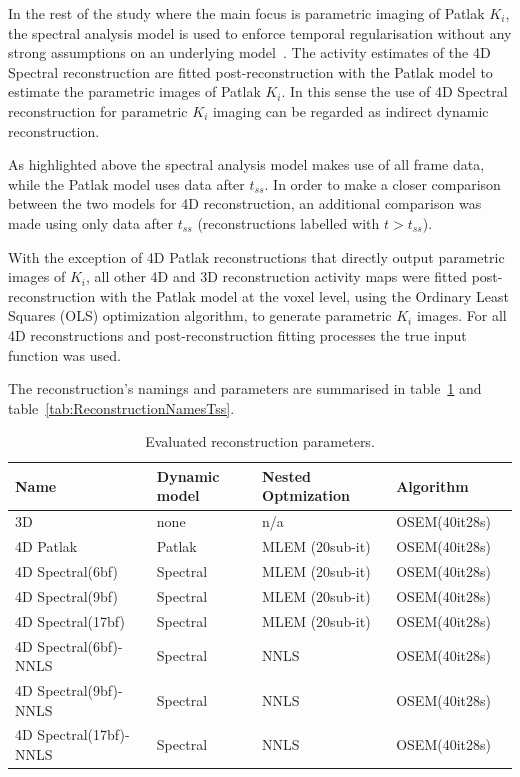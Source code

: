 \begin{itemize}
In the rest of the study where the main focus is parametric imaging of Patlak ${K_i}$, the spectral analysis model is used to enforce temporal regularisation without any strong assumptions on an underlying model~\cite{Reader2007}.
The  activity estimates of the 4D Spectral reconstruction are fitted post-reconstruction with the Patlak model
to estimate the parametric images of Patlak ${K_i}$. 
In this sense the use of 4D Spectral reconstruction for parametric $K_i$ imaging can be regarded as indirect dynamic reconstruction.
\end{itemize}

As highlighted above the spectral analysis model makes use of all frame data, while the Patlak model uses data after $t_{ss}$. In order to make a closer comparison between the two models for 4D reconstruction, an additional comparison was made using only data after $t_{ss}$ (reconstructions labelled with $t > t_{ss}$).

With the exception of 4D Patlak reconstructions that directly output parametric images of $K_i$, all other 4D and 3D reconstruction activity maps were fitted post-reconstruction with the Patlak model at the voxel level, using the Ordinary Least Squares (OLS) optimization algorithm, to generate parametric $K_i$ images. For all 4D reconstructions and post-reconstruction fitting processes the true input function was used.

The reconstruction's namings and parameters are summarised in table~\ref{tab:ReconstructionNames} and table~\ref{tab:ReconstructionNamesTss}.

\begin{table}[h!]
\caption{\label{tab:ReconstructionNames}Evaluated reconstruction parameters.}
\begin{tabular}{lllll}
\toprule
\textbf{Name} & \textbf{Dynamic model} & \textbf{Nested Optmization} & \textbf{Algorithm}  \\
\midrule
3D                   & none     & n/a              & OSEM(40it28s) \\
4D Patlak            & Patlak   & MLEM (20sub-it)  & OSEM(40it28s) \\
4D Spectral(6bf)     & Spectral & MLEM (20sub-it)  & OSEM(40it28s) \\
4D Spectral(9bf)     & Spectral & MLEM (20sub-it)  & OSEM(40it28s) \\
4D Spectral(17bf)    & Spectral & MLEM (20sub-it)  & OSEM(40it28s) \\
4D Spectral(6bf)-NNLS & Spectral & NNLS            & OSEM(40it28s) \\
4D Spectral(9bf)-NNLS & Spectral & NNLS            & OSEM(40it28s) \\
4D Spectral(17bf)-NNLS & Spectral & NNLS            & OSEM(40it28s) \\
\toprule
\end{tabular}
\end{table}

